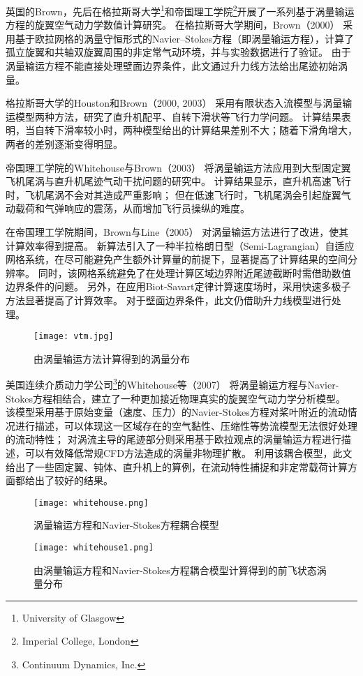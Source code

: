 \documentclass[doctor,openright,twoside,color]{buaathesis}
\begin{document}
英国的Brown，先后在格拉斯哥大学\footnote{University of Glasgow}和帝国理工学院\footnote{Imperial College, London}开展了一系列基于涡量输运方程的旋翼空气动力学数值计算研究。
在格拉斯哥大学期间，Brown（2000）
采用基于欧拉网格的涡量守恒形式的Navier–Stokes方程（即涡量输运方程），计算了孤立旋翼和共轴双旋翼周围的非定常气动环境，并与实验数据进行了验证。
由于涡量输运方程不能直接处理壁面边界条件，此文通过升力线方法给出尾迹初始涡量。

格拉斯哥大学的Houston和Brown（2000, 2003）
采用有限状态入流模型与涡量输运模型两种方法，研究了直升机配平、自转下滑状等飞行力学问题。
计算结果表明，当自转下滑率较小时，两种模型给出的计算结果差别不大；随着下滑角增大，两者的差别逐渐变得明显。

帝国理工学院的Whitehouse与Brown（2003）
将涡量输运方法应用到大型固定翼飞机尾涡与直升机尾迹气动干扰问题的研究中。
计算结果显示，直升机高速飞行时，飞机尾涡不会对其造成严重影响；
但在低速飞行时，飞机尾涡会引起旋翼气动载荷和气弹响应的震荡，从而增加飞行员操纵的难度。

在帝国理工学院期间，Brown与Line（2005）
对涡量输运方法进行了改进，使其计算效率得到提高。
新算法引入了一种半拉格朗日型（Semi-Lagrangian）自适应网格系统，在尽可能避免产生额外计算量的前提下，显著提高了计算结果的空间分辨率。
同时，该网格系统避免了在处理计算区域边界附近尾迹截断时需借助数值边界条件的问题。
另外，在应用Biot-Savart定律计算速度场时，采用快速多极子方法显著提高了计算效率。
对于壁面边界条件，此文仍借助升力线模型进行处理。
\begin{figure}[t!]
    \centering
    \texttt{[image: vtm.jpg]}
    \caption{由涡量输运方法计算得到的涡量分布}\label{vtm}
\end{figure}

美国连续介质动力学公司\footnote{Continuum Dynamics, Inc.}的Whitehouse等（2007）
将涡量输运方程与Navier-Stokes方程相结合，建立了一种更加接近物理真实的旋翼空气动力学分析模型。
该模型采用基于原始变量（速度、压力）的Navier-Stokes方程对桨叶附近的流动情况进行描述，可以体现这一区域存在的空气黏性、压缩性等势流模型无法很好处理的流动特性；
对涡流主导的尾迹部分则采用基于欧拉观点的涡量输运方程进行描述，可以有效降低常规CFD方法造成的涡量非物理扩散。
利用该耦合模型，此文给出了一些固定翼、钝体、直升机上的算例，在流动特性捕捉和非定常载荷计算方面都给出了较好的结果。
\begin{figure}[t!]
    \centering
    \texttt{[image: whitehouse.png]}
    \caption{涡量输运方程和Navier-Stokes方程耦合模型}
\end{figure}
\begin{figure}[t!]
    \centering
    \texttt{[image: whitehouse1.png]}
    \caption{由涡量输运方程和Navier-Stokes方程耦合模型计算得到的前飞状态涡量分布}
\end{figure}
\end{document}
